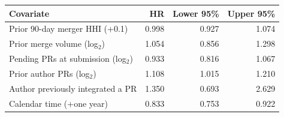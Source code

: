 \begin{tabular}{lrrr}
\toprule
Covariate & HR & Lower 95\% & Upper 95\% \\
\midrule
Prior 90-day merger HHI (+0.1) & 0.998 & 0.927 & 1.074 \\
Prior merge volume (log$_2$) & 1.054 & 0.856 & 1.298 \\
Pending PRs at submission (log$_2$) & 0.933 & 0.816 & 1.067 \\
Prior author PRs (log$_2$) & 1.108 & 1.015 & 1.210 \\
Author previously integrated a PR & 1.350 & 0.693 & 2.629 \\
Calendar time (+one year) & 0.833 & 0.753 & 0.922 \\
\bottomrule
\end{tabular}
